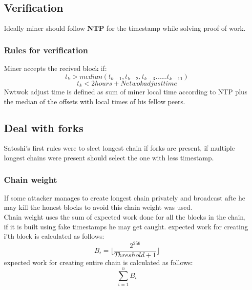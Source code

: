 \documentclass{article}
\begin{document}
\subsection{Verification}
Ideally miner should follow \textbf{NTP} for the timestamp while solving proof of work.
\subsubsection{Rules for verification}
Miner accepts the recived block if:
$$t_k > median(t_{k-1},t_{k-2},t_{k-3}...... t_{k-11})$$
$$t_k < 2hours + Netwok adjust time$$
Nwtwok adjust time is defined as sum of miner local time according to NTP plus the median of the offsets with local times of his fellow peers.
\subsection{Deal with forks}
Satoshi's first rules were to slect longest chain if forks are present, if multiple longest chains were present should select the one with less timestamp.
\subsubsection{Chain weight}
If some attacker manages to create longest chain privately and broadcast afte he may kill the honest blocks to avoid this chain weight was used. \\
Chain weight uses the sum of expected work done for all the blocks
in the chain, if it is built using fake timestamps he may get caught.
expected work for creating i'th block is calculated as follows:
$$B_i = \lfloor \frac{2^{256}}{Threshold + 1} \rfloor$$
expected work for creating entire chain is calculated as follows:
$$\sum_{i=1}^{n}B_i$$
\end{document}
